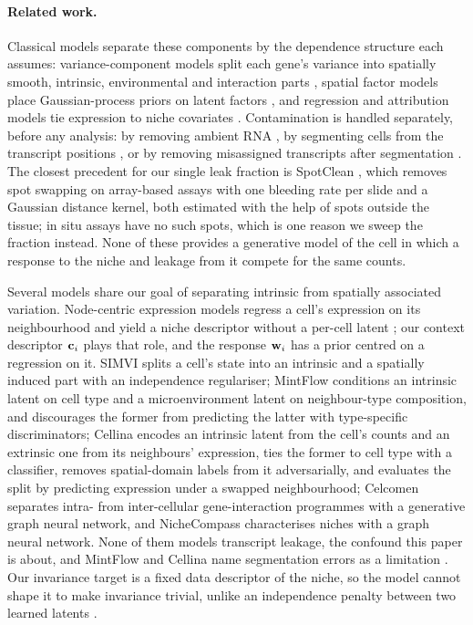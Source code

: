 \paragraph{Related work.}
Classical models separate these components by the dependence structure each assumes: variance-component models split each gene's variance into spatially smooth, intrinsic, environmental and interaction parts \citep{svensson2018spatialde,arnol2019svca}, spatial factor models place Gaussian-process priors on latent factors \citep{townes2023nsf,velten2022mefisto}, and regression and attribution models tie expression to niche covariates \citep{cable2022cside,tanevski2022misty}. Contamination is handled separately, before any analysis: by removing ambient RNA \citep{young2020soupx,yang2020decontx,fleming2023cellbender}, by segmenting cells from the transcript positions \citep{petukhov2022baysor}, or by removing misassigned transcripts after segmentation \citep{mitchel2026celladmix}. The closest precedent for our single leak fraction is SpotClean \citep{ni2022spotclean}, which removes spot swapping on array-based assays with one bleeding rate per slide and a Gaussian distance kernel, both estimated with the help of spots outside the tissue; in situ assays have no such spots, which is one reason we sweep the fraction instead. None of these provides a generative model of the cell in which a response to the niche and leakage from it compete for the same counts.

Several models share our goal of separating intrinsic from spatially associated variation. Node-centric expression models regress a cell's expression on its neighbourhood and yield a niche descriptor without a per-cell latent \citep{fischer2023}; our context descriptor $\mathbf{c}_i$ plays that role, and the response $\mathbf{w}_i$ has a prior centred on a regression on it. SIMVI \citep{dong2025simvi} splits a cell's state into an intrinsic and a spatially induced part with an independence regulariser; MintFlow \citep{akbarnejad2025mintflow} conditions an intrinsic latent on cell type and a microenvironment latent on neighbour-type composition, and discourages the former from predicting the latter with type-specific discriminators; Cellina \citep{moeed2026cellina} encodes an intrinsic latent from the cell's counts and an extrinsic one from its neighbours' expression, ties the former to cell type with a classifier, removes spatial-domain labels from it adversarially, and evaluates the split by predicting expression under a swapped neighbourhood; Celcomen \citep{megas2026celcomen} separates intra- from inter-cellular gene-interaction programmes with a generative graph neural network, and NicheCompass \citep{birk2025nichecompass} characterises niches with a graph neural network. None of them models transcript leakage, the confound this paper is about, and MintFlow and Cellina name segmentation errors as a limitation . Our invariance target is a fixed data descriptor of the niche, so the model cannot shape it to make invariance trivial, unlike an independence penalty between two learned latents \citep{dong2025simvi}.


